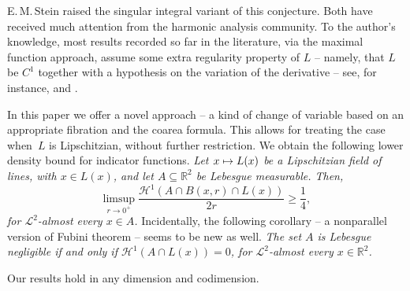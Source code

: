 \documentclass[11pt]{article}
\theoremstyle{definition}
\theoremstyle{jepanonymous}
\theoremstyle{plain}
\newcommand\mto{\mathchoice{\longmapsto}{\mapsto}{\mapsto}{\mapsto}}
\newcommand{\R}{\mathbb{R}}
\newcommand{\calH}{\mathscr{H}}
\newcommand{\calL}{\mathscr{L}}
\let\subset\subseteq
\begin{document}
\par
E.\,M.\,Stein raised the singular integral variant of this conjecture.
Both have received much attention from the harmonic analysis community.
To the author's knowledge, most results recorded so far in the literature, via the maximal function approach, assume some extra regularity property of $L$ -- namely, that $L$ be $C^1$ together with a hypothesis on the variation of the derivative -- see, for instance, \cite{BOU.89} and \cite{LAC.LI.10}.
\par
In this paper we offer a novel approach -- a kind of change of variable based on an appropriate fibration and the coarea formula.
This allows for treating the case when~$L$ is Lipschitzian, without further restriction.
We obtain the following lower density bound for indicator functions.
{\it
Let $x \mto L(x)$ be a Lipschitzian field of lines, with $x \in L(x)$, and let $A \subset \R^2$ be Lebesgue measurable.
Then,\vspace*{-3pt}
\begin{equation*}
\limsup_{r \to 0^+} \frac{\calH^1(A \cap B(x,r)\cap L(x))}{2r} \geq \frac{1}{4},
\end{equation*}
for $\calL^2$-almost every $x \in A$.
}
Incidentally, the following corollary -- a nonparallel version of Fubini theorem -- seems to be new as well.
{\it
The set $A$ is Lebesgue negligible if and only if $\calH^1(A \cap L(x))=0$, for $\calL^2$-almost every $x \in \R^2$.
}
\par
Our results hold in any dimension and codimension.

\nocite{BRU.71}
\end{document}
